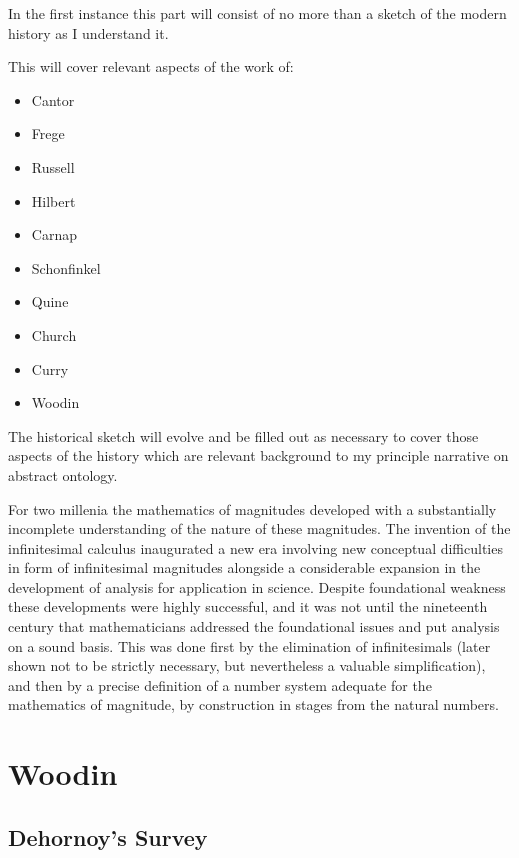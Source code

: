 
In the first instance this part will consist of no more than a sketch of the modern history as I understand it.

This will cover relevant aspects of the work of:

\begin{itemize}
\item Cantor
\item Frege
\item Russell
\item Hilbert
\item Carnap
\item Schonfinkel
\item Quine
\item Church
\item Curry
\item Woodin
\end{itemize}

The historical sketch will evolve and be filled out as necessary to cover those aspects of the history which are relevant background to my principle narrative on abstract ontology.

For two millenia the mathematics of magnitudes developed with a substantially incomplete understanding of the nature of these magnitudes.
The invention of the infinitesimal calculus inaugurated a new era involving new conceptual difficulties in form of infinitesimal magnitudes alongside a considerable expansion in the development of analysis for application in science.
Despite foundational weakness these developments were highly successful, and it was not until the nineteenth century that mathematicians addressed the foundational issues and put analysis on a sound basis.
This was done first by the elimination of infinitesimals (later shown not to be strictly necessary, but nevertheless a valuable simplification), and then by a precise definition of a number system adequate for the mathematics of magnitude, by construction in stages from the natural numbers.

\section{Woodin}

\subsection{Dehornoy's Survey}

